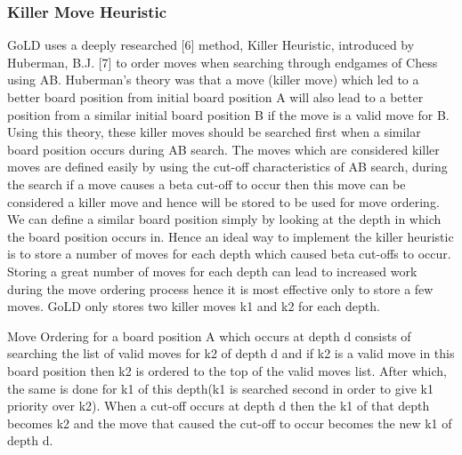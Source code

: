 \documentclass{l4proj}
\begin{document}
\subsubsection{Killer Move Heuristic}
GoLD uses a deeply researched [6] method, Killer Heuristic, introduced by Huberman, B.J. [7] to order moves when searching through endgames of Chess using AB. Huberman’s theory was that a move (killer move) which led to a better board position from initial board position A will also lead to a better position from a similar initial board position B if the move is a valid move for B.  Using this theory, these killer moves should be searched first when a similar board position occurs during AB search. The moves which are considered killer moves are defined easily by using the cut-off characteristics of AB search, during the search if a move causes a beta cut-off to occur then this move can be considered a killer move and hence will be stored to be used for move ordering.  We can define a similar board position simply by looking at the depth in which the board position occurs in. Hence an ideal way to implement the killer heuristic is to store a number of moves for each depth which caused beta cut-offs to occur. Storing a great number of moves for each depth can lead to increased work during the move ordering process hence it is most effective only to store a few moves. GoLD only stores two killer moves k1 and k2  for each depth.

Move Ordering for a board position A which occurs at depth d consists of searching the list of valid moves for k2 of depth d and if k2 is a valid move in this board position then k2 is ordered to the top of the valid moves list. After which, the same is done for k1 of this depth(k1 is searched second in order to give k1 priority over k2). When a cut-off occurs at depth d then the k1 of that depth becomes k2 and the move that caused the cut-off to occur becomes the new k1 of depth d.
\end{document}
